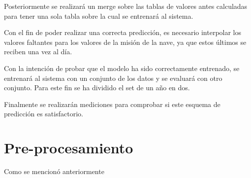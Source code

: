 \documentclass[../Main.tex]{subfiles}
\begin{document}
Posteriormente se realizará un merge sobre las tablas de valores antes calculadas para tener una sola tabla sobre la cual se entrenará al sistema. 

Con el fin de poder realizar una correcta predicción, es necesario interpolar los valores faltantes para los valores de la misión de la nave, ya que estos últimos se reciben una vez al día.

Con la intención de probar que el modelo ha sido correctamente entrenado, se entrenará al sistema con un conjunto de los datos y se evaluará con otro conjunto. Para este fin se ha dividido el set de un año en dos.

Finalmente se realizarán mediciones para comprobar si este esquema de predicción es satisfactorio.

\section{Pre-procesamiento}
Como se mencionó anteriormente
\end{document}

